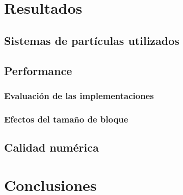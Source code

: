 \documentclass[a4paper,10pt]{report}
\begin{document}
\chapter{Resultados}
\section{Sistemas de partículas utilizados}
\section{Performance}
\subsection{Evaluación de las implementaciones}
\subsection{Efectos del tamaño de bloque}
\section{Calidad numérica}














\chapter{Conclusiones}
\end{document}
